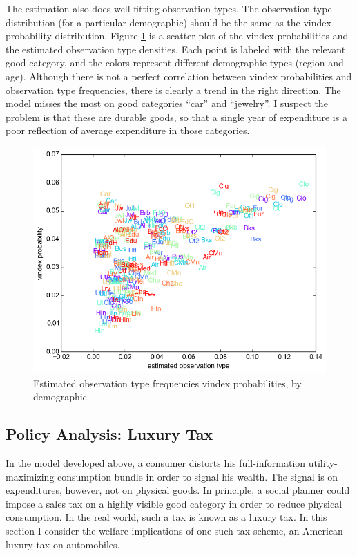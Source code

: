 The estimation also does well fitting observation types.
The observation type distribution (for a particular demographic) should be the same as the vindex probability distribution.
Figure \ref{fig:vinmatch} is a scatter plot of the vindex probabilities and the estimated observation type densities.  Each point is labeled with the relevant good category, and the colors represent different demographic types (region and age). Although there is not a perfect correlation between vindex probabilities and observation type frequencies, there is clearly a trend in the right direction.  The model misses the most on good categories ``car'' and ``jewelry''.  I suspect the problem is that these are durable goods, so that a single year of expenditure is a poor reflection of average expenditure in those categories.
\begin{figure}
    \centering
	\includegraphics[scale=.8]{pics/obs_vin_scat.png}
    \caption{Estimated observation type frequencies vindex probabilities, by demographic}
    \label{fig:vinmatch}
\end{figure}

\subsection{Policy Analysis: Luxury Tax}

In the model developed above, a consumer distorts his full-information utility-maximizing consumption bundle in order to signal his wealth.  The signal is on expenditures, however, not on physical goods.  In principle, a social planner could impose a sales tax on a highly visible good category in order to reduce physical consumption.  In the real world, such a tax is known as a luxury tax.  In this section I consider the welfare implications of one such tax scheme, an American luxury tax on automobiles.

